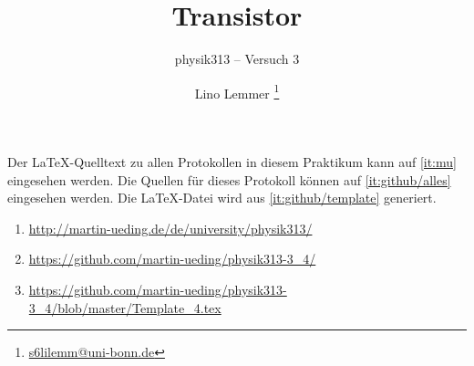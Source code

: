 


\usepackage{placeins}



\subject{Praktikumsprotokoll}
\title{Transistor}
\subtitle{physik313 – Versuch 3}
\author{
	Lino Lemmer \footnote{\href{mailto:s6lilemm@uni-bonn.de}{s6lilemm@uni-bonn.de}}
}


\newcommand\IB{I_\text{B}}
\newcommand\IC{I_\text{C}}
\newcommand\ID{I_\text{D}}
\newcommand\IE{I_\text{E}}
\newcommand\IS{I_\text{S}}
\newcommand\RC{R_\text{C}}
\newcommand\RD{R_\text{D}}
\newcommand\RE{R_\text{E}}
\newcommand\UBE{U_\text{BE}}
\newcommand\UB{U_\text{B}}
\newcommand\UC{U_\text{C}}
\newcommand\UCE{U_\text{CE}}
\newcommand\UE{U_\text{E}}
\newcommand\UG{U_\text{G}}
\newcommand\UGS{U_\text{GS}}
\newcommand\UDS{U_\text{DS}}

\usepackage{tocloft}


\newcommand{\FIXME}[1]{\printTODO{FIXME: #1}}
\newcommand{\TODO}[1]{\printTODO{TODO: #1}}
\newcommand{\XXX}[1]{\printTODO{XXX: #1}}
\newcommand{\FRAGE}[1]{\printTODO{Rückfrage: #1}}

\newcommand{\printTODO}[1]{
	\par%
	\textcolor{OrangeRed}{\textsf{#1}}%
	\par%
	\refstepcounter{todo}
	\addcontentsline{lotd}{todo}{#1}
}



\maketitle

Der \LaTeX-Quelltext zu allen Protokollen in diesem Praktikum kann auf
\ref{it:mu} eingesehen werden. Die Quellen für dieses Protokoll können auf
\ref{it:github/alles} eingesehen werden. Die \LaTeX-Datei wird aus
\ref{it:github/template} generiert.

\begin{enumerate}
	\item
		\label{it:mu}
		\url{http://martin-ueding.de/de/university/physik313/}
	\item
		\label{it:github/alles}
		\url{https://github.com/martin-ueding/physik313-3_4/}
	\item
		\label{it:github/template}
		\url{https://github.com/martin-ueding/physik313-3_4/blob/master/Template_4.tex}
\end{enumerate}

